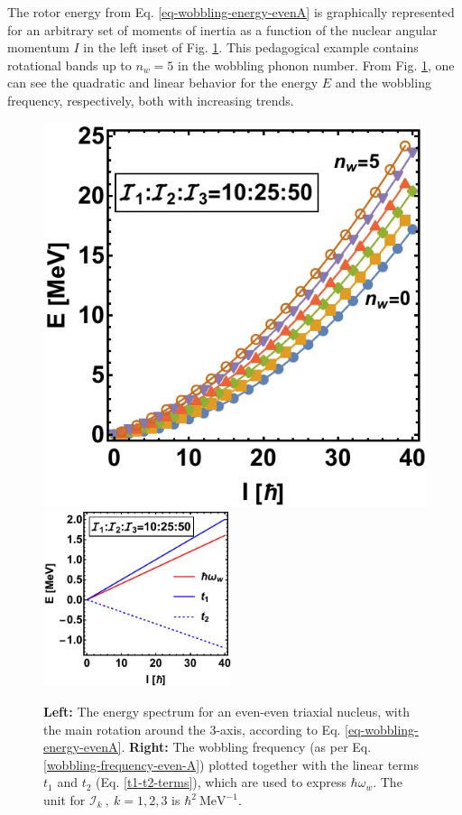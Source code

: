 The rotor energy from Eq. \ref{eq-wobbling-energy-evenA} is graphically represented for an arbitrary set of moments of inertia as a function of the nuclear angular momentum $I$ in the left inset of Fig. \ref{fig-even-even-wobbling-energies}. This pedagogical example contains rotational bands up to $n_w=5$ in the wobbling phonon number. From Fig. \ref{fig-even-even-wobbling-energies}, one can see the quadratic and linear behavior for the energy $E$ and the wobbling frequency, respectively, both with increasing trends.
\begin{figure}
    \centering
    \includegraphics[scale=0.755]{Chapters/Figures/wobblingFreq-evenA.pdf}
    \includegraphics[width=0.49\textwidth]{Chapters/Figures/wobbling-evenA.pdf}
    \caption{\textbf{Left:} The energy spectrum for an even-even triaxial nucleus, with the main rotation around the $3$-axis, according to Eq. \ref{eq-wobbling-energy-evenA}. \textbf{Right:} The wobbling frequency (as per Eq. \ref{wobbling-frequency-even-A}) plotted together with the linear terms $t_1$ and $t_2$ (Eq. \ref{t1-t2-terms}), which are used to express $\hbar\omega_w$. The unit for $\mathcal{I}_k\ ,\ k=1,2,3$ is $\hbar^2\ \text{MeV}^{-1}$.}
    \label{fig-even-even-wobbling-energies}
\end{figure}

